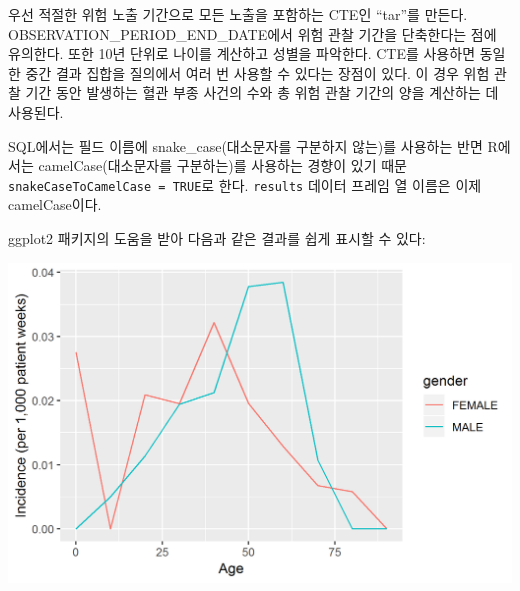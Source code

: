 \documentclass[10.5pt]{book}
\newenvironment{Shaded}{\begin{snugshade}}{\end{snugshade}}
\newcommand{\KeywordTok}[1]{\textcolor[rgb]{0.13,0.29,0.53}{\textbf{#1}}}
\newcommand{\DataTypeTok}[1]{\textcolor[rgb]{0.13,0.29,0.53}{#1}}
\newcommand{\DecValTok}[1]{\textcolor[rgb]{0.00,0.00,0.81}{#1}}
\newcommand{\StringTok}[1]{\textcolor[rgb]{0.31,0.60,0.02}{#1}}
\newcommand{\CommentTok}[1]{\textcolor[rgb]{0.56,0.35,0.01}{\textit{#1}}}
\newcommand{\OperatorTok}[1]{\textcolor[rgb]{0.81,0.36,0.00}{\textbf{#1}}}
\newcommand{\NormalTok}[1]{#1}
\theoremstyle{definition}
\theoremstyle{definition}
\theoremstyle{definition}
\theoremstyle{remark}
\begin{document}
우선 적절한 위험 노출 기간으로 모든 노출을 포함하는 CTE인 ``tar''를
만든다. OBSERVATION\_PERIOD\_END\_DATE에서 위험 관찰 기간을 단축한다는
점에 유의한다. 또한 10년 단위로 나이를 계산하고 성별을 파악한다. CTE를
사용하면 동일한 중간 결과 집합을 질의에서 여러 번 사용할 수 있다는
장점이 있다. 이 경우 위험 관찰 기간 동안 발생하는 혈관 부종 사건의 수와
총 위험 관찰 기간의 양을 계산하는 데 사용된다.

SQL에서는 필드 이름에 snake\_case(대소문자를 구분하지 않는)를 사용하는
반면 R에서는 camelCase(대소문자를 구분하는)를 사용하는 경향이 있기 때문
\texttt{snakeCaseToCamelCase\ =\ TRUE}로 한다. \texttt{results} 데이터
프레임 열 이름은 이제 camelCase이다.

ggplot2 패키지의 도움을 받아 다음과 같은 결과를 쉽게 표시할 수 있다:

\begin{Shaded}
\end{Shaded}

\begin{center}\includegraphics[width=0.8\linewidth]{images/SqlAndR/ir} \end{center}
\end{document}
